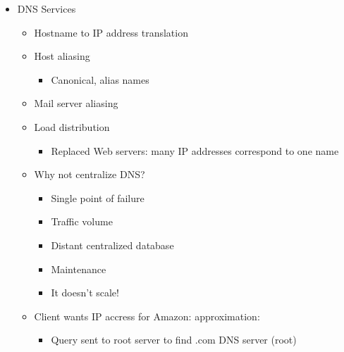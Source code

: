 \begin{itemize}
  \item DNS Services

    \begin{itemize}

      \item Hostname to IP address translation

      \item Host aliasing

        \begin{itemize}

          \item Canonical, alias names

        \end{itemize}

      \item Mail server aliasing

      \item Load distribution

        \begin{itemize}

          \item Replaced Web servers: many IP addresses correspond to one name

        \end{itemize}

      \item Why not centralize DNS?

        \begin{itemize}

          \item Single point of failure

          \item Traffic volume

          \item Distant centralized database

          \item Maintenance

          \item It doesn't scale!

        \end{itemize}

      \item Client wants IP accress for Amazon:  approximation:

        \begin{itemize}

          \item Query sent to root server to find .com DNS server (root)


\end{itemize}
\end{itemize}
\end{itemize}
